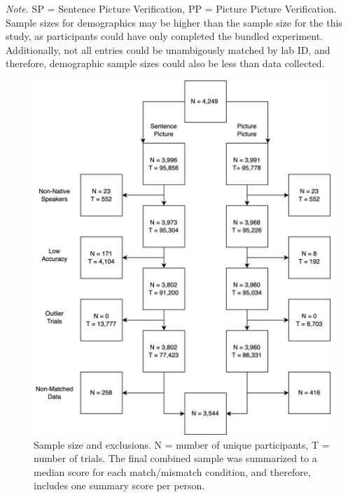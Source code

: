 \documentclass[
  man,floatsintext]{apa7}
\begin{document}
\begin{table}[tbp]
\begin{center}
\begin{threeparttable}
{}

\begin{tablenotes}[para]
\normalsize{\textit{Note.} SP = Sentence Picture Verification, PP = Picture Picture Verification. Sample sizes for demographics may be higher than the sample size for the this study, as participants could have only completed the bundled experiment. Additionally, not all entries could be unambigously matched by lab ID, and therefore, demographic sample sizes could also be less than data collected.}
\end{tablenotes}

\end{threeparttable}
\end{center}

\end{table}

\begin{figure}
\includegraphics[width=5.71in]{includes/fig/psa002_flow.drawio} \caption{Sample size and exclusions. N = number of unique participants, T = number of trials. The final combined sample was summarized to a median score for each match/mismatch condition, and therefore, includes one summary score per person.}\label{fig:sample-fig}
\end{figure}
\end{document}
